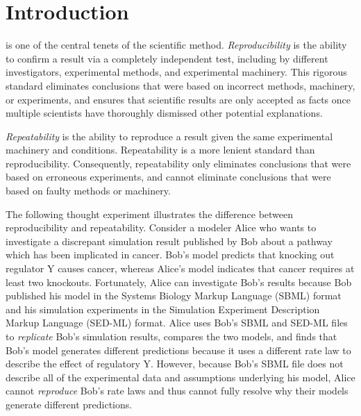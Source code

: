 \documentclass[journal,transmag,twoside]{IEEEtran}
\begin{document}
\section{Introduction}
% 
% 
% 
% 
 is one of the central tenets of the scientific method.
\textit{Reproducibility} is the ability to confirm a result via a completely independent test, including by different investigators, experimental methods, and experimental machinery. 
This rigorous standard eliminates conclusions that were based on incorrect methods, machinery, or experiments, and ensures that scientific results are only accepted as facts once multiple scientists have thoroughly dismissed other potential explanations. 

\textit{Repeatability} is the ability to reproduce a result given the same experimental machinery and conditions.
Repeatability is a more lenient standard than reproducibility. 
Consequently, repeatability only eliminates conclusions that were based on erroneous experiments, and cannot eliminate conclusions that were based on faulty methods or machinery.

The following thought experiment illustrates the difference between reproducibility and repeatability. Consider a modeler Alice who wants to investigate a discrepant simulation result published by Bob about a pathway which has been implicated in cancer. Bob's model predicts that knocking out regulator Y causes cancer, whereas Alice's model indicates that cancer requires at least two knockouts. Fortunately, Alice can investigate Bob's results because Bob published his model in the Systems Biology Markup Language (SBML) \cite{hucka2003} format and his simulation experiments in the Simulation Experiment Description Markup Language (SED-ML) \cite{sedml2011} format. Alice uses Bob's SBML and SED-ML files to \textit{replicate} Bob's simulation results, compares the two models, and finds that Bob's model generates different predictions because it uses a different rate law to describe the effect of regulatory Y. However, because Bob's SBML file does not describe all of the experimental data and assumptions underlying his model, Alice cannot \textit{reproduce} Bob's rate laws and thus cannot fully resolve why their models generate different predictions.
\end{document}
